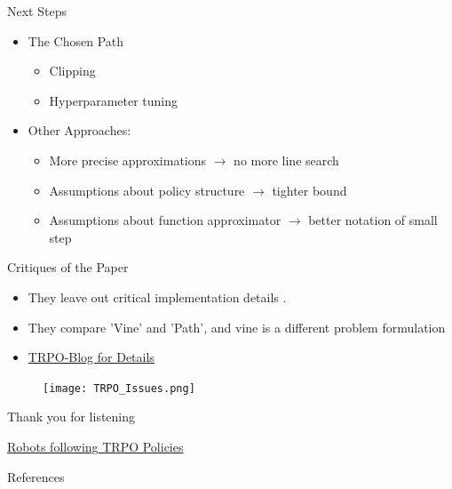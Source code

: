 \documentclass{beamer}
\begin{document}
\begin{frame}{Next Steps}
    \begin{itemize}
        \item The Chosen Path
        \begin{itemize}
            \item Clipping
            \item Hyperparameter tuning
        \end{itemize}
        \vspace{10pt}
        \item Other Approaches:
        \begin{itemize}
            \item More precise approximations $\rightarrow$ no more line search
            \item Assumptions about policy structure $\rightarrow$ tighter bound 
            \item Assumptions about function approximator $\rightarrow$ better notation of small step
        \end{itemize}
    \end{itemize}

\end{frame}

\newcommand{\bluecheck}{}%
\DeclareRobustCommand{\greencheck}{%
  \tikz\fill[scale=0.4, color=green]
  (0,.35) -- (.25,0) -- (1,.7) -- (.25,.15) -- cycle;%
}
\newcommand{\tikzxmark}{%
\tikz[scale=0.23, color=red] {
    \draw[line width=0.7,line cap=round] (0,0) to [bend left=6] (1,1);
    \draw[line width=0.7,line cap=round] (0.2,0.95) to [bend right=3] (0.8,0.05);
}}



\begin{frame}{Critiques of the Paper}
   
    \begin{itemize}
        \item They leave out critical implementation details \citep{deepRL_matters}. 
        \item They compare 'Vine' and 'Path', and vine is a different problem formulation 
        \item  \href{https://jonathan-hui.medium.com/rl-trust-region-policy-optimization-trpo-part-2-f51e3b2e373a}{TRPO-Blog for Details}
    \end{itemize}

\begin{figure}
    \centering
    \texttt{[image: TRPO\_Issues.png]}
    \label{fig:issues}
\end{figure}

\end{frame}


\begin{frame}{Thank you for listening}

\href{https://www.youtube.com/watch?v=ovDfhvjpQd8&t=387s}{Robots following TRPO Policies}

\end{frame}




\begin{frame}{References}
    
    
\end{frame}
\end{document}
